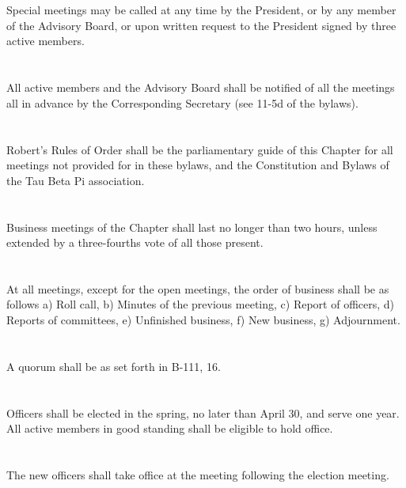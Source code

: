 \documentclass[12pt]{constitution}
\begin{document}
\section{}
Special meetings may be called at any time by the President, or by any member of the Advisory Board, or upon written request to the President signed by three active members.
\section{}
All active members and the Advisory Board shall be notified of all the meetings all in advance by the Corresponding Secretary (see 11-5d of the bylaws). 
\section{}
Robert's Rules of Order shall be the parliamentary guide of this Chapter for all meetings not provided for in these bylaws, and the Constitution and Bylaws of the Tau Beta Pi
association. 
\section{}
Business meetings of the Chapter shall last no longer than two hours, unless extended by a three-fourths vote of all those present.
\section{}
At all meetings, except for the open meetings, the order of business shall be as follows a) Roll call, b) Minutes of the previous meeting, c) Report of officers, d) Reports of committees, e) Unfinished business, f) New business, g) Adjournment.
\section {}
A quorum shall be as set forth in B-111, 16. 

\section{}
Officers shall be elected in the spring, no later than April 30, and serve one year. All active members in good standing shall be eligible to hold office.
\section{}
The new officers shall take office at the meeting following the election meeting.
\end{document}
